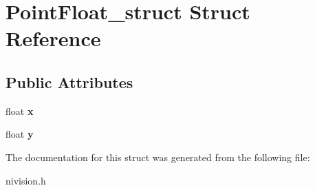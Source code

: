 \hypertarget{structPointFloat__struct}{
\section{PointFloat\_\-struct Struct Reference}
\label{structPointFloat__struct}
}
\subsection*{Public Attributes}
\begin{DoxyCompactItemize}
\item 
\hypertarget{structPointFloat__struct_af2f34d4c4169f4ea6808b317ad629233}{
float {\bfseries x}}
\label{structPointFloat__struct_af2f34d4c4169f4ea6808b317ad629233}

\item 
\hypertarget{structPointFloat__struct_a68233d3025b5283fc273c0ebe1b712a4}{
float {\bfseries y}}
\label{structPointFloat__struct_a68233d3025b5283fc273c0ebe1b712a4}

\end{DoxyCompactItemize}


The documentation for this struct was generated from the following file:\begin{DoxyCompactItemize}
\item 
nivision.h\end{DoxyCompactItemize}
